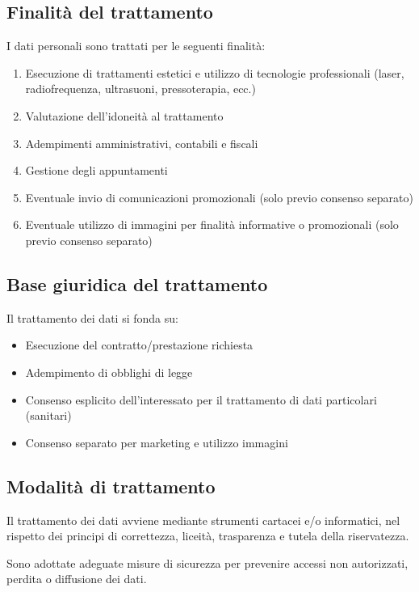 \subsection*{Finalità del trattamento}

I dati personali sono trattati per le seguenti finalità:

\begin{enumerate}
	\item Esecuzione di trattamenti estetici e utilizzo di tecnologie professionali (laser, radiofrequenza, ultrasuoni, pressoterapia, ecc.)
	\item Valutazione dell'idoneità al trattamento
	\item Adempimenti amministrativi, contabili e fiscali
	\item Gestione degli appuntamenti
	\item Eventuale invio di comunicazioni promozionali (solo previo consenso separato)
	\item Eventuale utilizzo di immagini per finalità informative o promozionali (solo previo consenso separato)
\end{enumerate}

\subsection*{Base giuridica del trattamento}

Il trattamento dei dati si fonda su:

\begin{itemize}
	\item Esecuzione del contratto/prestazione richiesta
	\item Adempimento di obblighi di legge
	\item Consenso esplicito dell'interessato per il trattamento di dati particolari (sanitari)
	\item Consenso separato per marketing e utilizzo immagini
\end{itemize}

\subsection*{Modalità di trattamento}

Il trattamento dei dati avviene mediante strumenti cartacei e/o informatici, nel rispetto dei principi di correttezza, liceità, trasparenza e tutela della riservatezza.

Sono adottate adeguate misure di sicurezza per prevenire accessi non autorizzati, perdita o diffusione dei dati.

